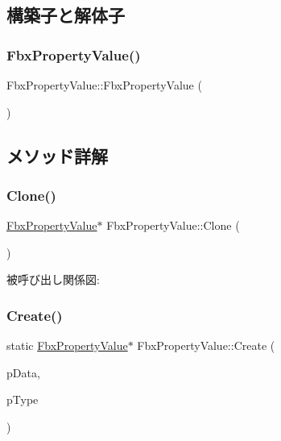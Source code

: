 \subsection{構築子と解体子}
\mbox{\label{class_fbx_property_value_a934248805a8fe3c9ea98f9480780a82d}} 
\subsubsection{\texorpdfstring{Fbx\+Property\+Value()}{FbxPropertyValue()}}
{\footnotesize\ttfamily Fbx\+Property\+Value\+::\+Fbx\+Property\+Value (\begin{DoxyParamCaption}{ }\end{DoxyParamCaption})}



\subsection{メソッド詳解}
\mbox{\label{class_fbx_property_value_a75133be7d5fcb9013955a940726d17da}} 
\subsubsection{\texorpdfstring{Clone()}{Clone()}}
{\footnotesize\ttfamily \hyperlink{class_fbx_property_value}{Fbx\+Property\+Value}$\ast$ Fbx\+Property\+Value\+::\+Clone (\begin{DoxyParamCaption}\item[{\hyperlink{class_fbx_property_page}{Fbx\+Property\+Page} $\ast$}]{ }\end{DoxyParamCaption})}

被呼び出し関係図\+:
\mbox{\label{class_fbx_property_value_a7640a14cf283be32d88fbef8ecf1a252}} 
\subsubsection{\texorpdfstring{Create()}{Create()}}
{\footnotesize\ttfamily static \hyperlink{class_fbx_property_value}{Fbx\+Property\+Value}$\ast$ Fbx\+Property\+Value\+::\+Create (\begin{DoxyParamCaption}\item[{void $\ast$}]{p\+Data,  }\item[{\hyperlink{fbxpropertytypes_8h_a73913a5ddfb20e57c6f25e9e6784bd92}{E\+Fbx\+Type}}]{p\+Type }\end{DoxyParamCaption})\hspace{0.3cm}{\ttfamily [static]}}

